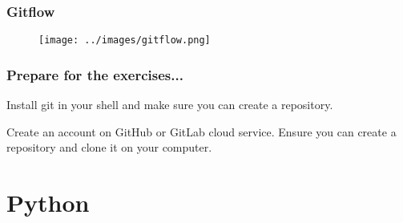 \begin{frame}
\frametitle{Gitflow}
   \begin{figure}
      \centering
      \texttt{[image: ../images/gitflow.png]}
   \end{figure}
\end{frame}


\begin{frame}
\frametitle{Prepare for the exercises...}
   Install git in your shell and make sure you can create a repository.

   Create an account on GitHub or GitLab cloud service.
   Ensure you can create a repository and clone it on your computer.
\end{frame}

\section{Python}


